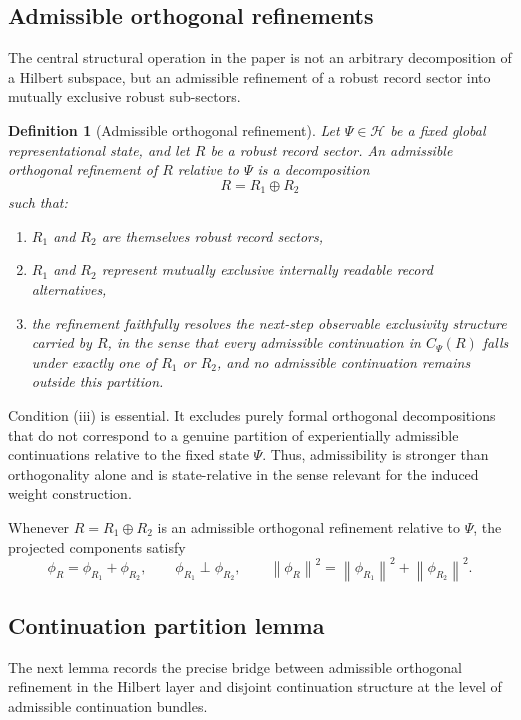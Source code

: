 \documentclass[11pt]{article}
\newtheorem{definition}{Definition}
\theoremstyle{remark}
\numberwithin{equation}{section}
\newcommand{\HH}{\mathcal{H}}
\newcommand{\Cpsi}[1]{C_{\Psi}\!\left(#1\right)}
\newcommand{\norm}[1]{\left\lVert #1 \right\rVert}
\begin{document}
\subsection{Admissible orthogonal refinements}

The central structural operation in the paper is not an arbitrary decomposition of a Hilbert subspace, but an admissible refinement of a robust record sector into mutually exclusive robust sub-sectors.

\begin{definition}[Admissible orthogonal refinement]
\label{def:admissible-refinement}
Let $\Psi \in \HH$ be a fixed global representational state, and let $R$ be a robust record sector. An \emph{admissible orthogonal refinement} of $R$ relative to $\Psi$ is a decomposition
\[
R = R_1 \oplus R_2
\]
such that:
\begin{enumerate}[label=(\roman*)]
\item $R_1$ and $R_2$ are themselves robust record sectors,
\item $R_1$ and $R_2$ represent mutually exclusive internally readable record alternatives,
\item the refinement faithfully resolves the next-step observable exclusivity structure carried by $R$, in the sense that every admissible continuation in $\Cpsi{R}$ falls under exactly one of $R_1$ or $R_2$, and no admissible continuation remains outside this partition.
\end{enumerate}
\end{definition}

Condition (iii) is essential. It excludes purely formal orthogonal decompositions that do not correspond to a genuine partition of experientially admissible continuations relative to the fixed state \(\Psi\). Thus, admissibility is stronger than orthogonality alone and is state-relative in the sense relevant for the induced weight construction.

Whenever $R = R_1 \oplus R_2$ is an admissible orthogonal refinement relative to \(\Psi\), the projected components satisfy
\[
\phi_R = \phi_{R_1} + \phi_{R_2},
\qquad
\phi_{R_1} \perp \phi_{R_2},
\qquad
\norm{\phi_R}^2 = \norm{\phi_{R_1}}^2 + \norm{\phi_{R_2}}^2.
\]

\subsection{Continuation partition lemma}

The next lemma records the precise bridge between admissible orthogonal refinement in the Hilbert layer and disjoint continuation structure at the level of admissible continuation bundles.
\end{document}
